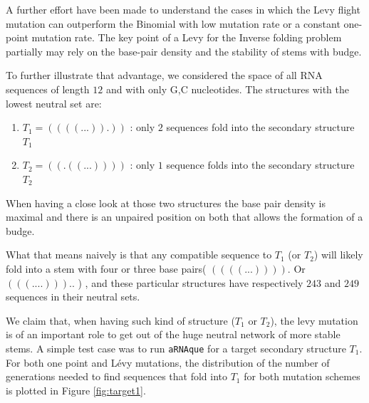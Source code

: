 A further effort have been made to understand the cases in which the Levy flight mutation can outperform the Binomial with low mutation rate or a constant one-point mutation rate.
The key point of a Levy for the Inverse folding problem partially may rely on the base-pair density and the stability of stems with budge.  

To further illustrate that advantage, we considered the space of all RNA sequences of length  $12$ and with only G,C nucleotides. The structures with the lowest neutral set are: 

\begin{enumerate}
	\item $T_1= ((((...)).))$ : only $2$ sequences fold into the secondary structure $T_1$
		\item $T_2= ((.((...))))$ : only $1$ sequence folds into the secondary structure $T_2$
\end{enumerate}

When having a close look at those two structures the base pair density is maximal and there is an unpaired position on both that allows the formation of a budge. 

What that means naively is that any compatible sequence to $T_1$ (or $T_2$) will likely fold into a stem with four or three base pairs( $((((...)))).$ Or $(((....)))..$ ) , and these particular structures have respectively $243$ and $249$ sequences in their neutral sets. 

We claim that, when having such kind of structure ($T_1$ or $T_2$), the levy mutation is of an important role to get out of the huge neutral network of more stable stems. A simple test case was to run \texttt{aRNAque} for a target secondary structure $T_1$.  For both one point and Lévy mutations, the distribution of the number of generations needed to find sequences that fold into $T_1$ for both mutation schemes is plotted in Figure \ref{fig:target1}. 

